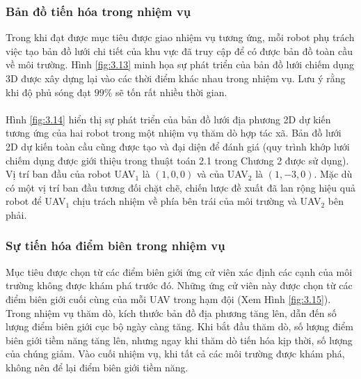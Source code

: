 \documentclass[11pt,openany]{book}
\begin{document}
\subsubsection{Bản đồ tiến hóa trong nhiệm vụ}
Trong khi đạt được mục tiêu được giao nhiệm vụ tương ứng, mỗi robot phụ trách việc tạo bản đồ lưới chi tiết của khu vực đã truy cập để có được bản đồ toàn cầu về môi trường. Hình \ref{fig:3.13} minh họa sự phát triển của bản đồ lưới chiếm dụng 3D được xây dựng lại vào các thời điểm khác nhau trong nhiệm vụ. Lưu ý rằng khi độ phủ sóng đạt $99\%$ sẽ tốn rất nhiều thời gian.\\\\
Hình \ref{fig:3.14} hiển thị sự phát triển của bản đồ lưới địa phương 2D dự kiến tương ứng của hai robot trong một nhiệm vụ thăm dò hợp tác xã. Bản đồ lưới 2D dự kiến toàn cầu cũng được tạo và đại diện để đánh giá (quy trình khớp lưới chiếm dụng được giới thiệu trong thuật toán 2.1 trong Chương 2 được sử dụng). Vị trí ban đầu của robot UAV$_1$ là $(1,0,0)$ và của UAV$_2$ là $(1,-3,0)$. Mặc dù có một vị trí ban đầu tương đối chặt chẽ, chiến lược đề xuất đã lan rộng hiệu quả robot để UAV$_1$ chịu trách nhiệm về phía bên trái của môi trường và UAV$_2$ bên phải.
\subsubsection{Sự tiến hóa điểm biên trong nhiệm vụ}
Mục tiêu được chọn từ các điểm biên giới ứng cử viên xác định các cạnh của môi trường không được khám phá trước đó. Những ứng cử viên này được chọn từ các điểm biên giới cuối cùng của mỗi UAV trong hạm đội (Xem Hình \ref{fig:3.15}). Trong nhiệm vụ thăm dò, kích thước bản đồ địa phương tăng lên, dẫn đến số lượng điểm biên giới cục bộ ngày càng tăng. Khi bắt đầu thăm dò, số lượng điểm biên giới tiềm năng tăng lên, nhưng ngay khi thăm dò tiến hóa kịp thời, số lượng của chúng giảm. Vào cuối nhiệm vụ, khi tất cả các môi trường được khám phá, không nên để lại điểm biên giới tiềm năng.
\end{document}
